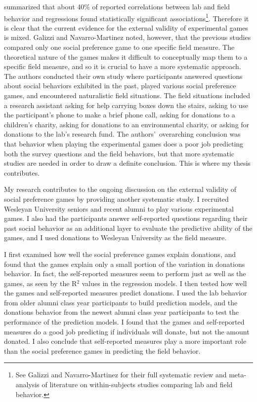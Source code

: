\documentclass[12pt]{article}
\begin{document}
\cite{galizzi_navarro-martinez_2017} summarized that about 40\% of reported correlations between lab and field behavior and regressions found statistically significant associations\footnote{See Galizzi and Navarro-Martinez for their full systematic review and meta-analysis of literature on within-subjects studies comparing lab and field behavior.}. Therefore it is clear that the current evidence for the external validity of experimental games is mixed. Galizzi and Navarro-Martinez noted, however, that the previous studies compared only one social preference game to one specific field measure. The theoretical nature of the games makes it difficult to conceptually map them to a specific field measure, and so it is crucial to have a more systematic approach. The authors conducted their own study where participants answered questions about social behaviors exhibited in the past, played various social preference games, and encountered naturalistic field situations. The field situations included a research assistant asking for help carrying boxes down the stairs, asking to use the participant\rq s phone to make a brief phone call, asking for donations to a children\rq s charity, asking for donations to an environmental charity, or asking for donations to the lab\rq s research fund.  The authors\rq \ overarching conclusion was that behavior when playing the experimental games does a poor job predicting both the survey questions and the field behaviors, but that more systematic studies are needed in order to draw a definite conclusion. This is where my thesis contributes.

My research contributes to the ongoing discussion on the external validity of social preference games by providing another systematic study. I recruited Wesleyan University seniors and recent alumni to play various experimental games. I also had the participants answer self-reported questions regarding their past social behavior as an additional layer to evaluate the predictive ability of the games, and I used donations to Wesleyan University as the field measure.

I first examined how well the social preference games explain donations, and found that the games explain only a small portion of the variation in donations behavior. In fact, the self-reported measures seem to perform just as well as the games, as seen by the R$^{2}$ values in the regression models. I then tested how well the games and self-reported measures predict donations. I used the lab behavior from older alumni class year participants to build prediction models, and the donations behavior from the newest alumni class year participants to test the performance of the prediction models. I found that the games and self-reported measures do a good job predicting if individuals will donate, but not the amount donated. I also conclude that self-reported measures play a more important role than the social preference games in predicting the field behavior.
\end{document}
